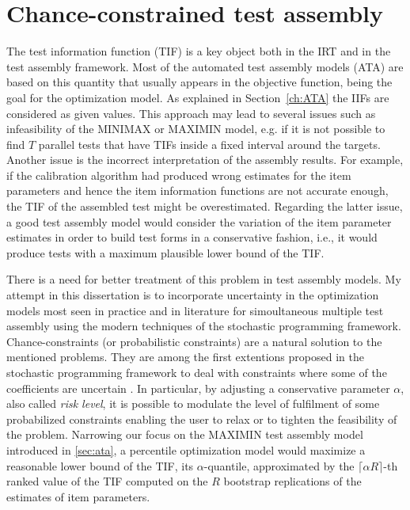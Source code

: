 
\chapter{Chance-constrained test assembly}
\label{sec:CC}

The test information function (TIF) is a key object both in the IRT and in the test assembly framework. Most of the automated test assembly models (ATA) are\label{key} based on this quantity that usually appears in the objective function, being the goal for the optimization model. As explained in Section~\ref{ch:ATA} the IIFs are considered as given values. This approach may lead to several issues such as infeasibility of the MINIMAX or MAXIMIN model, e.g. if it is not possible to find $T$ parallel tests that have TIFs inside a fixed interval around the targets. Another issue is the incorrect interpretation of the assembly results. For example, if the calibration algorithm had produced wrong estimates for the item parameters and hence the item information functions are not accurate enough, the TIF of the assembled test might be overestimated. Regarding the latter issue, a good test assembly model would consider the variation of the item parameter estimates in order to build test forms in a conservative fashion, i.e., it would produce tests with a maximum plausible lower bound of the TIF.  

There is a need for better treatment of this problem in test assembly models. My attempt in this dissertation is to incorporate uncertainty in the optimization models most seen in practice and in literature for simoultaneous multiple test assembly using the modern techniques of the stochastic programming framework. Chance-constraints (or probabilistic constraints) are a natural solution to the mentioned problems. They are among the first extentions proposed in the stochastic programming framework to deal with constraints where some of the coefficients are uncertain \parencite{charnes1963deterministic,krokhmal2002portfolio}. In particular, by adjusting a conservative parameter $\alpha$, also called \emph{risk level}, it is possible to modulate the level of fulfilment of some probabilized constraints enabling the user to relax or to tighten the feasibility of the problem. Narrowing our focus on the MAXIMIN test assembly model introduced in \ref{sec:ata}, a percentile optimization model would maximize a reasonable lower bound of the TIF, its $\alpha$-quantile, approximated by the $\lceil \alpha R \rceil$-th ranked value of the TIF computed on the $R$ bootstrap replications of the estimates of item parameters.

